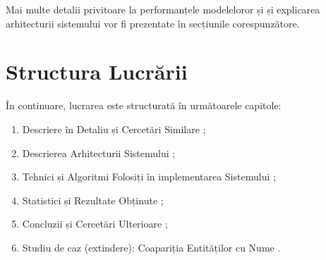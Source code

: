 Mai multe detalii privitoare la performanțele modeleloror și și explicarea arhitecturii sistemului vor fi prezentate în secțiunile corespunzătore.


\section{Structura Lucrării}

În continuare, lucrarea este structurată în următoarele capitole:

\begin{enumerate}

\item Descriere în Detaliu și Cercetări Similare ;
\item Descrierea Arhitecturii Sistemului ;
\item Tehnici și Algoritmi Folosiți în implementarea Sistemului ;
\item Statistici și Rezultate Obținute ;
\item Concluzii și Cercetări Ulterioare ;
\item Studiu de caz (extindere): Coapariția Entităților cu Nume .

\end{enumerate}

